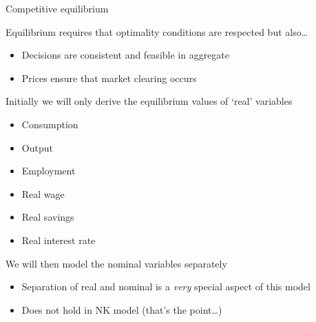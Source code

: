 \begin{frame}{Competitive equilibrium}

Equilibrium requires that optimality conditions are respected but also\ldots
\begin{itemize}
\item	Decisions are consistent and feasible in aggregate
\item	Prices ensure that market clearing occurs
\end{itemize}

Initially we will only derive the equilibrium values of `real' variables
\begin{itemize}
\item	Consumption
\item	Output
\item	Employment
\item	Real wage
\item	Real savings
\item	Real interest rate
\end{itemize}

We will then model the nominal variables separately
\begin{itemize}
\item	Separation of real and nominal is a \emph{very} special aspect of this model
\item	Does not hold in NK model (that's the point\ldots)
\end{itemize}

\end{frame}



%
%
%


